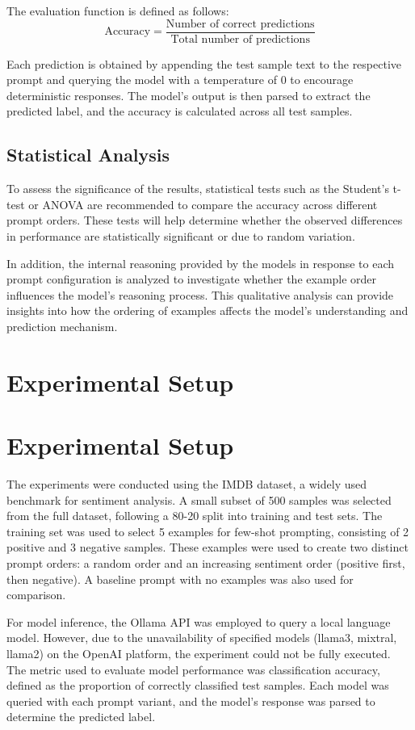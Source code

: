 \documentclass{article}
\begin{document}
The evaluation function is defined as follows:
$$
\text{Accuracy} = \frac{\text{Number of correct predictions}}{\text{Total number of predictions}}
$$

Each prediction is obtained by appending the test sample text to the respective prompt and querying the model with a temperature of $0$ to encourage deterministic responses. The model's output is then parsed to extract the predicted label, and the accuracy is calculated across all test samples.

\subsection{Statistical Analysis}

To assess the significance of the results, statistical tests such as the Student's t-test or ANOVA are recommended to compare the accuracy across different prompt orders. These tests will help determine whether the observed differences in performance are statistically significant or due to random variation.

In addition, the internal reasoning provided by the models in response to each prompt configuration is analyzed to investigate whether the example order influences the model's reasoning process. This qualitative analysis can provide insights into how the ordering of examples affects the model's understanding and prediction mechanism.
\section{Experimental Setup}
\section*{Experimental Setup}

The experiments were conducted using the IMDB dataset, a widely used benchmark for sentiment analysis. A small subset of 500 samples was selected from the full dataset, following a 80-20 split into training and test sets. The training set was used to select 5 examples for few-shot prompting, consisting of 2 positive and 3 negative samples. These examples were used to create two distinct prompt orders: a random order and an increasing sentiment order (positive first, then negative). A baseline prompt with no examples was also used for comparison.

For model inference, the Ollama API was employed to query a local language model. However, due to the unavailability of specified models (llama3, mixtral, llama2) on the OpenAI platform, the experiment could not be fully executed. The metric used to evaluate model performance was classification accuracy, defined as the proportion of correctly classified test samples. Each model was queried with each prompt variant, and the model's response was parsed to determine the predicted label.
\end{document}
